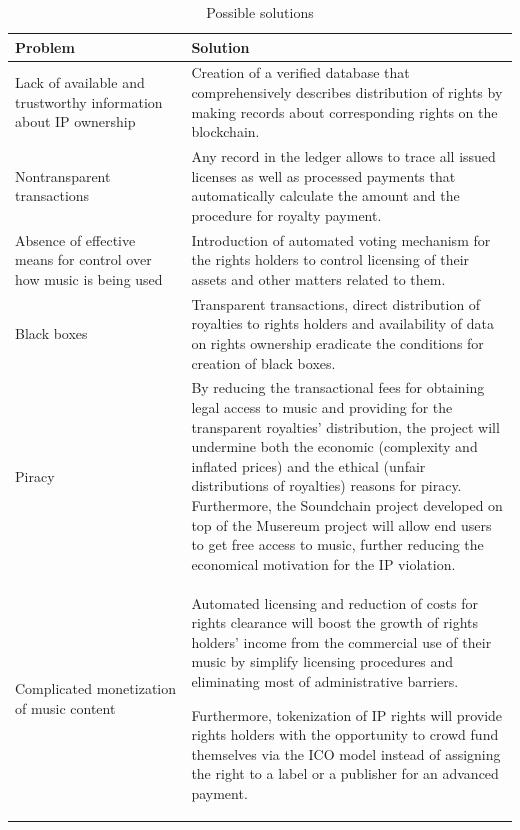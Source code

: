 \documentclass[12pt]{report}
\begin{document}
\begin{table}[H]
\centering
\caption{Possible solutions}
\vspace{20pt}
\begin{tabular}{p{0.35\linewidth}p{0.65\linewidth}}
\toprule
Problem & Solution \\
\bottomrule
\midrule
Lack of available and trustworthy information about IP ownership & 
Creation of a verified database that comprehensively describes distribution of rights by making records about corresponding rights on the blockchain. \\
\hline
Nontransparent transactions & 
Any record in the ledger allows to trace all issued licenses as well as processed payments that automatically calculate the amount and the procedure for royalty payment. \\
\hline
Absence of effective means for control over how music is being used &
Introduction of automated voting mechanism for the rights holders to control licensing of their assets and other matters related to them. \\
\hline
Black boxes & 
Transparent transactions, direct distribution of royalties to rights holders and availability of data on rights ownership eradicate the conditions for creation of black boxes. \\
\hline
Piracy &
By reducing the transactional fees for obtaining legal access to music and providing for the transparent royalties’ distribution, the project will undermine both the economic (complexity and inflated prices) and the ethical (unfair distributions of royalties) reasons for piracy. Furthermore, the Soundchain project developed on top of the Musereum project will allow end users to get free access to music, further reducing the economical motivation for the IP violation. \\
\hline
Complicated monetization of music content &
Automated licensing and reduction of costs for rights clearance will boost the growth of rights holders' income from the commercial use of their music by simplify licensing procedures and eliminating most of administrative barriers.

Furthermore, tokenization of IP rights will provide rights holders with the opportunity to crowd fund themselves via the ICO model instead of assigning the right to a label or a publisher for an advanced payment. \\
\bottomrule
\end{tabular}
\end{table}
\end{document}

